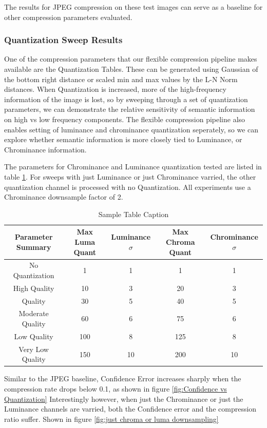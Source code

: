 The results for JPEG compression on these test images can serve as a baseline for other compression parameters evaluated.

\subsubsection{Quantization Sweep Results}

One of the compression parameters that our flexible compression pipeline makes available are the Quantization Tables.
These can be generated using Gaussian of the bottom right distance or scaled min and max values by the L-N Norm distances.
When Quantization is increased, more of the high-frequency information of the image is lost, so by sweeping through a set of quantization parameters, we can demonstrate the relative sensitivity of semantic information on high vs low frequency components.
The flexible compression pipeline also enables setting of luminance and chrominance quantization seperately, so we can explore whether semantic information is more closely tied to Luminance, or Chrominance information.

The parameters for Chrominance and Luminance quantization tested are listed in table \ref{tab:Quantization Parameters Table}. For sweeps with just Luminance or just Chrominance varried, the other quantization channel is processed with no Quantization.
All experiments use a Chrominance downsample factor of 2.

\begin{table}[h!]
\centering
\caption{Sample Table Caption}
\label{tab:Quantization Parameters Table}
\begin{tabular}{c|c|c|c|c}
\toprule
\textbf{Parameter Summary} & \textbf{Max Luma Quant} & \textbf{Luminance $\sigma$} & \textbf{Max Chroma Quant} & \textbf{Chrominance $\sigma$} \\
\midrule
No Quantization & 1 & 1 & 1 & 1 \\
High Quality & 10 & 3 & 20 & 3 \\
Quality & 30 & 5 & 40 & 5 \\
Moderate Quality & 60 & 6 & 75 & 6 \\
Low Quality & 100 & 8 & 125 & 8 \\
Very Low Quality & 150 & 10 & 200 & 10 \\
\bottomrule
\end{tabular}
\end{table}

Similar to the JPEG baseline, Confidence Error increases sharply when the compression rate drops below 0.1, as shown in figure \ref{fig:Confidence vs Quantization}
Interestingly however, when just the Chrominance or just the Luminance channels are varried, both the Confidence error and the compression ratio suffer. Shown in figure \ref{fig:just chroma or luma downsampling}

